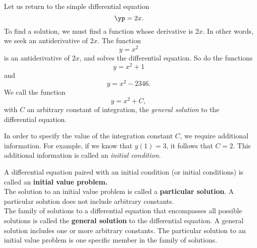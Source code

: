 Let us return to the simple differential equation
\[
\yp = 2x.
\]
To find a solution, we must find a function whose derivative is $2x$.  In other words, we seek an antiderivative of $2x.$  The function 
\[y = x^2\]
is an antiderivative of $2x$, and solves the differential equation.  So do the functions
\[y = x^2 + 1\]
and
\[y = x^2 - 2346.\]
We call the function
\[y = x^2 +  C,\]
with $C$ an arbitrary constant of integration, the \emph{general solution} to the differential equation.

In order to specify the value of the integration constant $C$, we require additional information.  For example, if we know that $y(1) = 3$, it follows that $C=2$.  This additional information is called an \emph{initial condition.}

{A differential equation paired with an initial condition (or initial conditions) is called an \textbf{initial value problem.}\\

The solution to an initial value problem is called a \textbf{particular solution}. A particular solution does not include arbitrary constants.\\

The family of solutions to a differential equation that encompasses all possible solutions is called the \textbf{general solution} to the differential equation. A general solution includes one or more arbitrary constants. The particular solution to an initial value problem is one specific member in the family of solutions.
}\\

